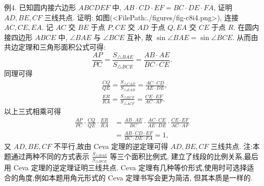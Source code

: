例4. 已知圆内接六边形 $A B C D E F$ 中, $A B \cdot C D \cdot E F=B C \cdot D E \cdot F A$, 证明 $A D, B E, C F$ 三线共点.
证明: 如图(<FilePath:./figures/fig-c8i4.png>), 连接 $A C, C E, E A$. 记 $A C$ 交 $B E$ 于点 $P, C E$ 交 $A D$ 于点 $Q, E A$ 交 $C E$ 于点 $R$.
在圆内接四边形 $A B C E$ 中, $\angle B A E$ 与 $\angle B C E$ 互补, 故 $\sin \angle B A E=\sin \angle B C E$. 从而由共边定理和三角形面积公式可得:
$$
\frac{A P}{P C}=\frac{S_{\triangle B A E}}{S_{\triangle B C E}}=\frac{A B \cdot A E}{B C \cdot C E} .
$$
同理可得
$$
\begin{aligned}
& \frac{C Q}{Q E}=\frac{S_{\triangle C A D}}{S_{\triangle E A D}}=\frac{A C \cdot C D}{A E \cdot D E}, \\
& \frac{E R}{R A}=\frac{S_{\triangle E C F}}{S_{\triangle A C F}}=\frac{C E \cdot E F}{A C \cdot A F} .
\end{aligned}
$$
以上三式相乘可得
$$
\begin{aligned}
\frac{A P}{P C} \cdot \frac{C Q}{Q E} \cdot \frac{E R}{R A} & =\frac{A B \cdot A E}{B C} \cdot \frac{A C \cdot C E}{A E \cdot D E} \cdot \frac{C E \cdot E F}{A C \cdot A F} \\
& =\frac{A B \cdot C D \cdot E F}{B C \cdot D E \cdot F A}=1,
\end{aligned}
$$
又 $A D, B E, C F$ 不平行,故由 Ceva 定理的逆定理可得 $A D, B E, C F$ 三线共点.
注:本题通过两种不同的方式表示 $\frac{S_{\triangle B A E}}{S_{\triangle B C E}}$ 等三个面积比例式, 建立了线段的比例关系,最后用 Ceva 定理的逆定理证明三线共点.
Ceva 定理有几种等价形式,使用时可选择适合的角度,例如本题用角元形式的 Ceva 定理书写会更为简洁, 但其本质是一样的.



